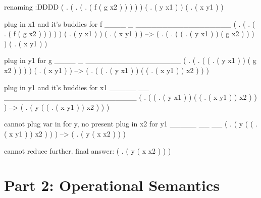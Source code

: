 \documentclass[11pt]{article}
\begin{document}
\begin{enumerate}
\begin{markdown}
            \a renaming :DDDD
            ( \lf. ( \lg. ( . ( f ( g x2 ) ) ) ) ) ( . ( y x1 ) ) ( . ( x y1 ) )

            plug in x1 and it's buddies for f
            ____                  _                  __________________
            ( \lf. ( \lg. ( . ( f ( g x2 ) ) ) ) ) ( . ( y x1 ) ) ( . ( x y1 ) )
            -->
            ( \lg. ( . ( ( . ( y x1 ) ) ( g x2 ) ) ) ) ( . ( x y1 ) )

            plug in y1 for g
            ____                                _            __________________
            ( \lg. ( . ( ( . ( y x1 ) ) ( g x2 ) ) ) ) ( . ( x y1 ) )
            -->
            ( . ( ( . ( y x1 ) ) ( ( . ( x y1 ) ) x2 ) ) )

            plug in y1 and it's buddies for x1
            _____     __     _________________________
            ( . ( ( . ( y x1 ) ) ( ( . ( x y1 ) ) x2 ) ) )
            -->
            ( . ( y ( ( . ( x y1 ) ) x2 ) ) )

            cannot plug var in for y, no \ly present
            plug in x2 for y1
            _____     __     __
            ( . ( y ( ( . ( x y1 ) ) x2 ) ) )
            -->
            ( . ( y ( x x2 ) ) )

            cannot reduce further.
            final answer:
            ( . ( y ( x x2 ) ) )
        \end{markdown}

        \vspace{1in}
    \end{enumerate}

    \newpage

    \section*{Part 2: Operational Semantics}
\end{document}
